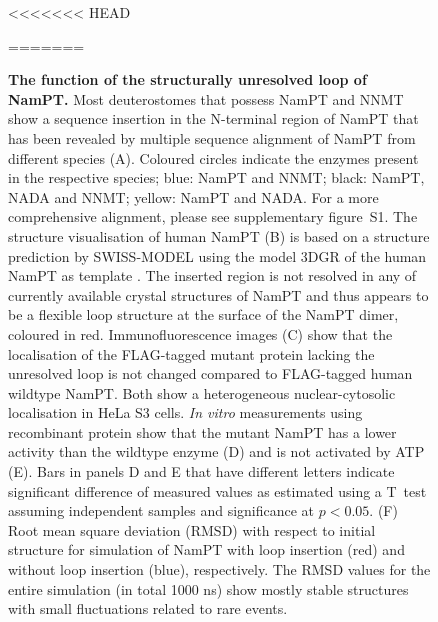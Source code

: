 \begin{figure}[ht]
<<<<<<< HEAD
  \caption{\textbf{The function of the structurally unresolved loop of NamPT.} Most deuterostomes that possess NamPT and NNMT show a sequence insertion in the N-terminal region of NamPT that has been revealed by multiple sequence alignment of NamPT from different species (A). Coloured circles indicate the enzymes present in the respective species; blue: NamPT and NNMT; black: NamPT, NADA and NNMT; yellow: NamPT and NADA. For a more comprehensive alignment, please see supplementary figure~S1. The structure visualisation of human NamPT (B) is based on a structure prediction by SWISS-MODEL \cite{Arnold2006,Biasini2014} using the model 3DGR of the human NamPT as template \cite{Burgos2009}. The inserted region is not resolved in any of currently available crystal structures of NamPT and thus appears to be a flexible loop structure at the surface of the NamPT dimer, coloured in red. Immunofluorescence images (C) show that the localisation of the FLAG-tagged mutant protein lacking the unresolved loop is not changed compared to FLAG-tagged human wildtype NamPT. Both show a heterogeneous nuclear-cytosolic localisation in HeLa S3 cells. \textit{In vitro} measurements using recombinant protein show that the mutant NamPT has a lower activity than the wildtype enzyme (D) and is not activated by ATP (E). Bars in panels D and E that have different letters indicate significant difference of measured values as estimated using a T~test assuming independent samples and significance at $p < 0.05$. (F) Root mean square deviation (RMSD) with respect to initial structure for simulation of NamPT with loop insertion (red) and without loop insertion (blue), respectively. The RMSD values for the entire simulation (in total 1000 ns) show mostly stable structures with small fluctuations related to rare events.}
=======

\end{figure}
